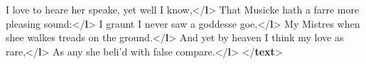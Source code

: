 \begin{shaded}
\hspace*{1em}\hspace*{1em}\hspace*{1em}I love to heare her speake, yet well I know,{</\textbf{l}>}\mbox{}\newline 
\hspace*{1em}\hspace*{1em}\hspace*{1em}That Musicke hath a farre more pleasing sound:{</\textbf{l}>}\mbox{}\newline 
\hspace*{1em}\hspace*{1em}\hspace*{1em}I graunt I never saw a goddesse goe,{</\textbf{l}>}\mbox{}\newline 
\hspace*{1em}\hspace*{1em}\hspace*{1em}My Mistres when shee walkes treads on the ground.{</\textbf{l}>}\mbox{}\newline 
\hspace*{1em}\hspace*{1em}\mbox{}\newline 
\hspace*{1em}\mbox{}\newline 
\hspace*{1em}\mbox{}\newline 
\hspace*{1em}\hspace*{1em}And yet by heaven I think my love as rare,{</\textbf{l}>}\mbox{}\newline 
\hspace*{1em}\hspace*{1em}As any she beli'd with false compare.{</\textbf{l}>}\mbox{}\newline 
\hspace*{1em}\mbox{}\newline 
{}\mbox{}\newline 
{</\textbf{text}>}\end{shaded}\egroup\par \noindent  \par

